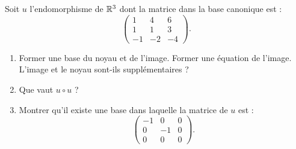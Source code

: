 Soit $u$ l'endomorphisme de $\mathbb{R}^3$ dont la matrice dans la base canonique est :
\[
\begin{pmatrix}
1 & 4 & 6 \\ 
1 & 1 & 3 \\ 
-1 & -2 & -4
\end{pmatrix}.
\]
\begin{enumerate}
  \item Former une base du noyau et de l'image. Former une équation de l'image. L'image et le noyau sont-ils supplémentaires ?
  \item Que vaut $u\circ u$ ?
  \item Montrer qu'il existe une base dans laquelle la matrice de $u$ est :
\[
\begin{pmatrix}
-1 & 0 & 0 \\ 
 0 & -1 & 0 \\ 
0 & 0 & 0
\end{pmatrix}.
\] 
\end{enumerate}
